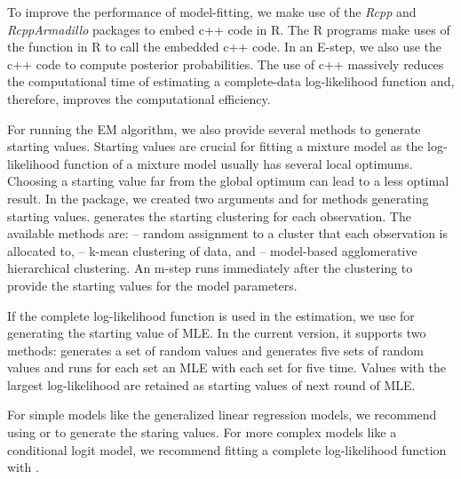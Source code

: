 \documentclass[nojss]{jss}
\begin{document}
   To improve the performance of model-fitting, we make use of the \emph{Rcpp} and \emph{RcppArmadillo} packages to embed c++ code in R. The R programs make uses of the  function in R to call the embedded c++ code. In an E-step, we also use the c++ code to compute posterior probabilities. The use of c++ massively reduces the computational time of estimating a complete-data log-likelihood function and, therefore, improves the computational efficiency.    
   
   For running the EM algorithm, we also provide several methods to generate starting values. Starting values are crucial for fitting a mixture model as the log-likelihood function of a mixture model usually has several local optimums. Choosing a starting value far from the global optimum can lead to a less optimal result. In the package, we created two arguments  and  for methods generating starting values.  generates the starting clustering for each observation. The available methods are:  -- random assignment to a cluster that each observation is allocated to,  -- k-mean clustering of data, and  -- model-based agglomerative hierarchical clustering. An m-step runs immediately after the clustering to provide the starting values for the model parameters.
   
   If the complete log-likelihood function is used in the estimation, we use  for generating the starting value of MLE. In the current version, it supports two methods:  generates a set of random values and  generates five sets of random values and runs for each set an MLE with each set for five time. Values with the largest log-likelihood are retained as starting values of next round of MLE.  
   
   For simple models like the generalized linear regression models, we recommend using  or  to generate the staring values. For more complex models like a conditional logit model, we recommend fitting a complete log-likelihood function with .
   
\end{document}
